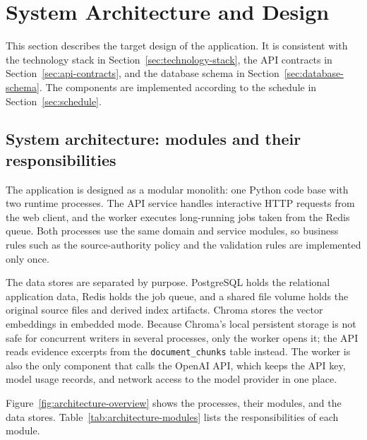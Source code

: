 \documentclass[12pt,a4paper]{article}
\begin{document}
\clearpage

\section{System Architecture and Design}
\label{sec:architecture}

This section describes the target design of the application. It is
consistent with the technology stack in
Section~\ref{sec:technology-stack}, the API contracts in
Section~\ref{sec:api-contracts}, and the database schema in
Section~\ref{sec:database-schema}. The components are implemented
according to the schedule in Section~\ref{sec:schedule}.

\subsection{System architecture: modules and their responsibilities}
\label{sec:architecture-modules}

The application is designed as a modular monolith: one Python code
base with two runtime processes. The API service handles interactive
HTTP requests from the web client, and the worker executes
long-running jobs taken from the Redis queue. Both processes use the
same domain and service modules, so business rules such as the
source-authority policy and the validation rules are implemented
only once.

The data stores are separated by purpose. PostgreSQL holds the
relational application data, Redis holds the job queue, and a shared
file volume holds the original source files and derived index
artifacts. Chroma stores the vector embeddings in embedded mode.
Because Chroma's local persistent storage is not safe for concurrent
writers in several processes, only the worker opens it; the API
reads evidence excerpts from the \texttt{document\_chunks} table
instead. The worker is also the only component that calls the OpenAI
API, which keeps the API key, model usage records, and network
access to the model provider in one place.

Figure~\ref{fig:architecture-overview} shows the processes, their
modules, and the data stores. Table~\ref{tab:architecture-modules}
lists the responsibilities of each module.
\end{document}
